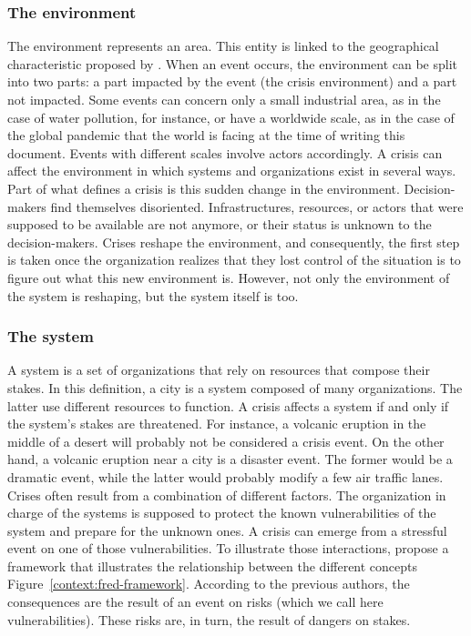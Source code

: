 \subsubsection{The environment}
The environment represents an area.
This entity is linked to the geographical characteristic proposed by \textcite{fertierInterpretationAutomatiqueDonnees2018}.
When an event occurs, the environment can be split into two parts: a part impacted by the event (the crisis environment) and a part not impacted.
Some events can concern only a small industrial area, as in the case of water pollution, for instance, or have a worldwide scale, as in the case of the global pandemic that the world is facing at the time of writing this document.
Events with different scales involve actors accordingly.
A crisis can affect the environment in which systems and organizations exist in several ways.
Part of what defines a crisis is this sudden change in the environment.
Decision-makers find themselves disoriented.
Infrastructures, resources, or actors that were supposed to be available are not anymore, or their status is unknown to the decision-makers.
Crises reshape the environment, and consequently, the first step is taken once the organization realizes that they lost control of the situation is to figure out what this new environment is.
However, not only the environment of the system is reshaping, but the system itself is too.

\subsubsection{The system}
A system is a set of organizations that rely on resources that compose their stakes.
In this definition, a city is a system composed of many organizations.
The latter use different resources to function.
A crisis affects a system if and only if the system's stakes are threatened.
For instance, a volcanic eruption in the middle of a desert will probably not be considered a crisis event.
On the other hand, a volcanic eruption near a city is a disaster event.
The former would be a dramatic event, while the latter would probably modify a few air traffic lanes.
Crises often result from a combination of different factors.
The organization in charge of the systems is supposed to protect the known vulnerabilities of the system and prepare for the unknown ones.
A crisis can emerge from a stressful event on one of those vulnerabilities.
To illustrate those interactions, \textcite{benabenCollaborativeSystemsCrisis2014} propose a framework that illustrates the relationship between the different concepts Figure~\ref{context:fred-framework}.
According to the previous authors, the consequences are the result of an event on risks (which we call here vulnerabilities).
These risks are, in turn, the result of dangers on stakes.

